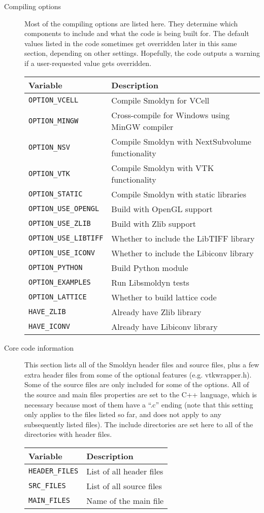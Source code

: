 \documentclass {book}
\begin{document}
\begin{description}
\item[Compiling options]
Most of the compiling options are listed here. They determine which components to include and what the code is being built for. The default values listed in the code sometimes get overridden later in this same section, depending on other settings. Hopefully, the code outputs a warning if a user-requested value gets overridden.
\begin{longtable}[c]{ll}
Variable & Description\\
\hline
\texttt{OPTION\_VCELL} & Compile Smoldyn for VCell\\
\texttt{OPTION\_MINGW} & Cross-compile for Windows using MinGW compiler\\
\texttt{OPTION\_NSV} & Compile Smoldyn with NextSubvolume functionality\\
\texttt{OPTION\_VTK} & Compile Smoldyn with VTK functionality\\
\texttt{OPTION\_STATIC} & Compile Smoldyn with static libraries\\
\texttt{OPTION\_USE\_OPENGL} & Build with OpenGL support\\
\texttt{OPTION\_USE\_ZLIB} & Build with Zlib support\\
\texttt{OPTION\_USE\_LIBTIFF} & Whether to include the LibTIFF library\\
\texttt{OPTION\_USE\_ICONV} & Whether to include the Libiconv library\\
\texttt{OPTION\_PYTHON}  & Build Python module\\
\texttt{OPTION\_EXAMPLES} & Run Libsmoldyn tests\\
\texttt{OPTION\_LATTICE} & Whether to build lattice code\\
\texttt{HAVE\_ZLIB} & Already have Zlib library\\
\texttt{HAVE\_ICONV} & Already have Libiconv library\\
\end{longtable}

\item[Core code information]
This section lists all of the Smoldyn header files and source files, plus a few extra header files from some of the optional features (e.g. vtkwrapper.h). Some of the source files are only included for some of the options. All of the source and main files properties are set to the C++ language, which is necessary because most of them have a ``.c'' ending (note that this setting only applies to the files listed so far, and does not apply to any subsequently listed files). The include directories are set here to all of the directories with header files.
\begin{longtable}[c]{ll}
Variable & Description\\
\hline
\texttt{HEADER\_FILES} & List of all header files\\
\texttt{SRC\_FILES} & List of all source files\\
\texttt{MAIN\_FILES} & Name of the main file\\
\end{longtable}


\end{description}
\end{document}
